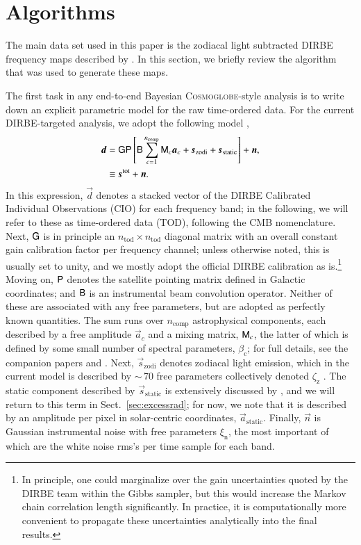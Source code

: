 \documentclass{aa}
\newcommand{\dv}[0]{\vec{d}}
\newcommand{\B}[0]{\tens{B}}
\newcommand{\G}[0]{\tens{G}}
\newcommand{\n}[0]{\vec{n}}
\newcommand{\s}[0]{\vec{s}}
\renewcommand{\a}[0]{\vec{a}}
\newcommand{\M}[0]{\tens{M}}
\renewcommand{\P}[0]{\tens{P}}
\newcommand{\cosmoglobe}{\textsc{Cosmoglobe}}
\begin{document}
\section{Algorithms}
\label{sec:algorithm}

The main data set used in this paper is the zodiacal light subtracted
DIRBE frequency maps described by \citet{CG02_01}. In this section, we
briefly review the algorithm that was used to generate these maps.


The first task in any end-to-end Bayesian \cosmoglobe-style analysis
is to write down an explicit parametric model for the raw time-ordered
data. For the current DIRBE-targeted analysis, we adopt the following
model \citep{CG02_01},
\begin{align}
	\label{eq:model}
	\dv &=\G\P\left[\B\sum_{c=1}^{n_{\mathrm{comp}}}\M_c\a_c+\s_{\mathrm{zodi}} +
          \s_{\mathrm{static}}\right] + \n,\\
        &\equiv \s^{\mathrm{tot}} + \n.
\end{align}
In this expression, $\dv$ denotes a stacked vector of the DIRBE
Calibrated Individual Observations (CIO) for each frequency band; in
the following, we will refer to these as time-ordered data (TOD),
following the CMB nomenclature. Next, $\G$ is in principle an
$n_{\mathrm{tod}}\times n_{\mathrm{tod}}$ diagonal matrix with an
overall constant gain calibration factor per frequency channel; unless
otherwise noted, this is usually set to unity, and we mostly adopt the
official DIRBE calibration as is.\footnote{In principle, one could
marginalize over the gain uncertainties quoted by the DIRBE team
within the Gibbs sampler, but this would increase the Markov chain
correlation length significantly. In practice, it is computationally
more convenient to propagate these uncertainties analytically into the
final results.}  Moving on, $\P$ denotes the satellite pointing
matrix defined in Galactic coordinates; and $\B$ is an
instrumental beam convolution operator. Neither of these are
associated with any free parameters, but are adopted as perfectly
known quantities. The sum runs over $n_{\mathrm{comp}}$ astrophysical
components, each described by a free amplitude $\a_c$ and a mixing
matrix, $\M_c$, the latter of which is defined by some small number of
spectral parameters, $\beta_{\mathrm{c}}$; for full details, see
the companion papers \citet{CG02_04} and \citet{CG02_05}. Next, $\s_{\mathrm{zodi}}$ denotes zodiacal
light emission, which in the current model is described by $\sim$\,70
free parameters collectively denoted $\zeta_{\mathrm{z}}$
\citep{CG02_02}. The static component described by
$\s_{\mathrm{static}}$ is extensively discussed by \citet{CG02_01},
and we will return to this term in Sect.~\ref{sec:excessrad}; for now,
we note that it is described by an amplitude per pixel in
solar-centric coordinates, $\a_{\mathrm{static}}$. Finally, $\n$
is Gaussian instrumental noise with free parameters
$\xi_{\mathrm{n}}$, the most important of which are the white noise
rms's per time sample for each band.
\end{document}
